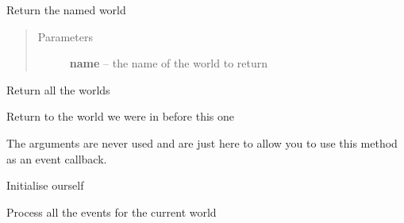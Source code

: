 \documentclass[letterpaper,10pt,english]{sphinxmanual}
\begin{document}
\begin{fulllineitems}
\begin{fulllineitems}
\end{fulllineitems}


\begin{fulllineitems}
\label{engine:serge.engine.Engine.getWorld}
Return the named world
\begin{quote}\begin{description}
\item[{Parameters}] \leavevmode
\textbf{name} -- the name of the world to return

\end{description}\end{quote}

\end{fulllineitems}


\begin{fulllineitems}
\label{engine:serge.engine.Engine.getWorlds}
Return all the worlds

\end{fulllineitems}


\begin{fulllineitems}
\label{engine:serge.engine.Engine.goBackToPreviousWorld}
Return to the world we were in before this one

The arguments are never used and are just here to allow you to use
this method as an event callback.

\end{fulllineitems}


\begin{fulllineitems}
\label{engine:serge.engine.Engine.init}
Initialise ourself

\end{fulllineitems}


\begin{fulllineitems}
\label{engine:serge.engine.Engine.processEvents}
Process all the events for the current world


\end{fulllineitems}
\end{fulllineitems}
\end{document}
